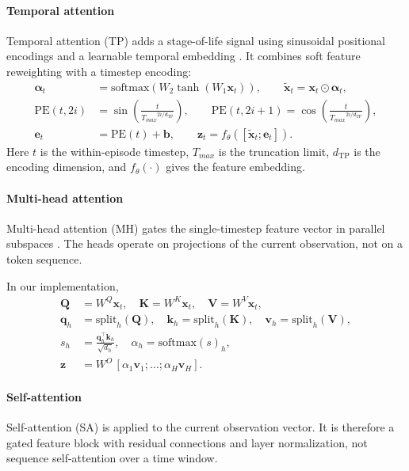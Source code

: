 \documentclass[sn-basic]{sn-jnl}%
\begin{document}
\paragraph{Temporal attention}
Temporal attention (TP) adds a stage-of-life signal using sinusoidal positional encodings and a learnable temporal embedding \cite{Vaswani2017, Lim2020TFT}. It combines soft feature reweighting with a timestep encoding:
\begin{align}
        \boldsymbol{\alpha}_t &= \mathrm{softmax}\!\left(W_2\tanh\!\left(W_1\mathbf{x}_t\right)\right),
        \qquad \tilde{\mathbf{x}}_t = \mathbf{x}_t\odot\boldsymbol{\alpha}_t,\\
        \mathrm{PE}(t,2i) &= \sin\!\left(\frac{t}{{T_{max}}^{2i/d_{\mathrm{TP}}}}\right),
        \qquad \mathrm{PE}(t,2i+1)=\cos\!\left(\frac{t}{{T_{max}}^{2i/d_{\mathrm{TP}}}}\right),\\
        \mathbf{e}_t &= \mathrm{PE}(t) + \mathbf{b},
        \qquad \mathbf{z}_t = f_\theta\!\left([\tilde{\mathbf{x}}_t;\mathbf{e}_t]\right).
\end{align}
Here $t$ is the within-episode timestep, $T_{max}$ is the truncation limit, $d_{\mathrm{TP}}$ is the encoding dimension, and $f_\theta(\cdot)$ gives the feature embedding.

\paragraph{Multi-head attention}
Multi-head attention (MH) gates the single-timestep feature vector in parallel subspaces \cite{Vaswani2017}. The heads operate on projections of the current observation, not on a token sequence.

In our implementation,
\begin{align}
        \mathbf{Q}&=W^Q\mathbf{x}_t,\quad \mathbf{K}=W^K\mathbf{x}_t,\quad \mathbf{V}=W^V\mathbf{x}_t,\\
        \mathbf{q}_h&=\mathrm{split}_h(\mathbf{Q}),\quad \mathbf{k}_h=\mathrm{split}_h(\mathbf{K}),\quad \mathbf{v}_h=\mathrm{split}_h(\mathbf{V}),\\
        s_h&=\frac{\mathbf{q}_h^\top\mathbf{k}_h}{\sqrt{d_h}},\quad \alpha_h=\mathrm{softmax}(s)_h,\\
        \mathbf{z}&=W^O\,[\alpha_1\mathbf{v}_1;\ldots;\alpha_H\mathbf{v}_H].
\end{align}

\paragraph{Self-attention}
Self-attention (SA) is applied to the current observation vector. It is therefore a gated feature block with residual connections and layer normalization, not sequence self-attention over a time window.
\end{document}
